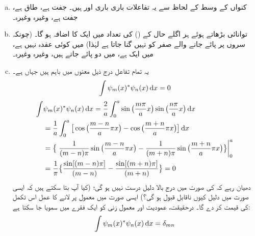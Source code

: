 \begin{enumerate}[a.]
\item
 کنواں کے وسط کے لحاظ سے یہ تفاعلات باری باری  اور  ہیں۔   جفت ہے،   طاق ہے،  جفت ہے، وغیرہ وغیرہ۔
\item
توانائی بڑھاتے ہوئے ہر اگلے حال کے  () کی تعداد میں ایک  کا اضافہ ہو گا۔ (چونکہ سروں پر پائے جانے والے  صفر کو نہیں گنا جاتا ہے لہٰذا)  میں کوئی عقدہ نہیں  ہے،  میں ایک  ہے،  میں دو   پائے جاتے  ہیں، وغیرہ وغیرہ۔
\item
 یہ تمام تفاعل درج ذیل  معنوں میں  باہم   ہیں جہاں   ہے۔
\begin{align}
\int\psi_{m}(x)^*\psi_{n}(x)\dif{x}=0
\end{align}
\quad
\begin{align*}
\int&\psi_{m}(x)^*\psi_{n}(x)\dif{x}=\frac{2}{a}\int_{0}^{a}\sin\big(\frac{m\pi}{a}x\big)\sin\big(\frac{n\pi}{a}x\big)\dif{x}\\
&=\frac{1}{a}\int_{0}^{a}\big[\cos\big(\frac{m-n}{a}\pi x\big)-\cos\big(\frac{m+n}{a}\pi x\big)\big]\dif{x}\\
&=\big\{\left.\frac{1}{(m-n)\pi}\sin\big(\frac{m-n}{a}\pi x\big)-\frac{1}{(m+n)\pi}\sin\big(\frac{m+n}{a}\pi x\big)\big\}\right\vert_{0}^{a}\\
&=\frac{1}{\pi}\big\{\frac{\sin[(m-n)\pi]}{(m-n)}-\frac{\sin[(m+n)\pi]}{(m+n)}\big\}=0
\end{align*} 
دھیان رہے کہ  کی صورت میں درج بالا دلیل درست نہیں ہو گی؛ (کیا آپ بتا سکتے ہیں کہ ایسی صورت میں دلیل کیوں ناقابل قبول ہو گی؟) ایسی صورت میں معمول پر لانے کا عمل اس   تکمل کی قیمت  کر دے گا۔ درحقیقت، عمودیت اور معمول زنی کو ایک فقرے میں سمویا جا سکتا ہے:
\begin{align}
\int\psi_{m}(x)^*\psi_{n}(x)\dif{x}=\delta_{mn}
\end{align}

\end{enumerate}
